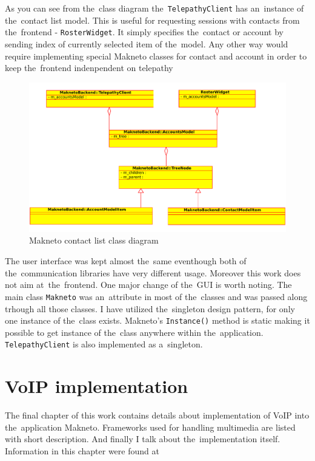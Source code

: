 As you can see from the~class diagram the~\verb|TelepathyClient| has an~instance of the~contact list model. This is useful for requesting sessions with contacts from the~frontend - \verb|RosterWidget|. It simply specifies the~contact or account by sending index of currently selected item of the~model. Any other way would require implementing special Makneto classes for contact and account in order to keep the~frontend indenpendent on telepathy   

\begin{figure}[ht]
	\begin{center}
	\includegraphics[width=15cm]{fig/contact-list-class-diag.pdf}
	\caption{Makneto contact list class diagram}
	\label{fig:contactListClassDiag}
\end{center}
\end{figure}

The user interface was kept almost the~same eventhough both of the~communication libraries have very different usage. Moreover this work does not aim at~the~frontend. One major change of the~GUI is worth noting. The main class \verb|Makneto| was an~attribute in most of the~classes and was passed along trhough all those classes. I have utilized the~singleton design pattern, for only one instance of the~class exists. Makneto's \verb|Instance()| method is static making it possible to get instance of the~class  anywhere within the~application. \verb|TelepathyClient| is also implemented as a~singleton. 


\chapter{VoIP implementation}\label{chapter:voip-implementation}
The final chapter of this work contains details about implementation of VoIP into the~application Makneto. Frameworks used for handling multimedia are listed with short description. And finally I talk about the~implementation itself. Information in this chapter were found at~\cite{gstreamer, phonon, farsight} 

